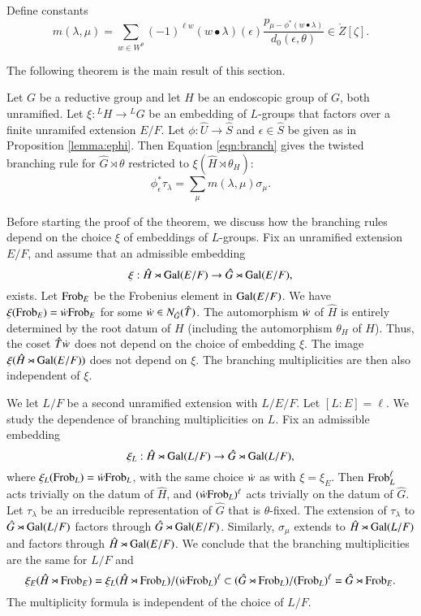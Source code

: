 Define constants 
\begin{equation}\label{eqn:branch}
m(\lambda,\mu) = \sum_{w\in W^\theta} 
(-1)^{\ell w} ({w\bullet\lambda})(\epsilon)
\frac{p_{\mu-\phi^*(w\bullet\lambda)}}{d_0(\epsilon,\theta)} \in \ring{Z}[\zeta].
\end{equation}

The following theorem is the main result of this section.

\begin{theorem}\label{thm:branch}
  Let $G$ be a reductive group and let $H$ be an endoscopic group of
  $G$, both unramified.  Let $\xi:{}^LH\to {}^LG$ be an embedding of
  $L$-groups that factors over a finite unramifed extension $E/F$.
  Let $\phi:\hat U\to \hat S$ and $\epsilon\in\hat S$ be given as in
  Proposition \ref{lemma:ephi}.  Then Equation \ref{eqn:branch} gives
  the twisted branching rule for $\hat G\rtimes \theta$ restricted to
  $\xi(\hat H\rtimes \theta_H)$:
\[
\phi^*_\epsilon\tau_\lambda = \sum_\mu m(\lambda,\mu) \sigma_\mu.
\]
\end{theorem}

Before starting the proof of the theorem, we discuss how the branching
rules depend on the choice $\xi$ of embeddings of $L$-groups.  Fix an
unramified extension $E/F$, and assume that an admissible embedding
\[
\xi:\hat H \rtimes {\operatorname{Gal}}(E/F)\to \hat G \rtimes {\operatorname{Gal}}(E/F),
\]
exists.  Let ${\operatorname{Frob}}_{E}$ be the Frobenius element in
${\operatorname{Gal}}(E/F)$.  We have $\xi({\operatorname{Frob}}_{E}) = \dot w {\operatorname{Frob}}_E$ for
some $\dot w \in N_{\hat G}(\hat T)$.  The automorphism $\dot w $ of
$\hat H$ is entirely determined by the root datum of $H$ (including
the automorphism $\theta_H$ of $H$).  Thus, the coset $\hat T \dot w $
does not depend on the choice of embedding $\xi$.  The image $\xi(\hat
H\rtimes {\operatorname{Gal}}(E/F))$ does not depend on $\xi$.  The branching
multiplicities are then also independent of $\xi$.

We let $L/F$ be a second unramified extension with $L/E/F$.  Let
$[L:E]=\ell$.  We study the dependence of branching multiplicities on
$L$.  Fix an admissible embedding
\[
\xi_L:\hat H \rtimes {\operatorname{Gal}}(L/F)\to \hat G \rtimes {\operatorname{Gal}}(L/F),
\]
where $\xi_L({\operatorname{Frob}}_L) = \dot w {\operatorname{Frob}}_L$, with the same choice $\dot w $
as with $\xi = \xi_E$.  Then ${\operatorname{Frob}}_L^\ell$ acts trivially on the
datum of $\hat H$, and $(\dot w {\operatorname{Frob}}_L)^\ell$ acts trivially on the
datum of $\hat G$.  Let $\tau_\lambda$ be an irreducible
representation of $\hat G$ that is $\theta$-fixed.  The extension of
$\tau_\lambda$ to $\hat G\rtimes {\operatorname{Gal}}(L/F)$ factors through $\hat
G\rtimes {\operatorname{Gal}}(E/F)$.  Similarly, $\sigma_\mu$ extends to $\hat
H\rtimes {\operatorname{Gal}}(L/F)$ and factors through $\hat
H\rtimes{\operatorname{Gal}}(E/F)$.  We conclude that the branching multiplicities
are the same for $L/F$ and
\[
\xi_E(\hat H \rtimes {\operatorname{Frob}}_E) 
= \xi_L(\hat H\rtimes {\operatorname{Frob}}_L)/(\dot w {\operatorname{Frob}}_L)^\ell 
\subset (\hat G\rtimes {\operatorname{Frob}}_L)/( {\operatorname{Frob}}_L)^\ell 
= \hat G\rtimes {\operatorname{Frob}}_E.
\]
The multiplicity formula is independent of the choice of $L/F$.


